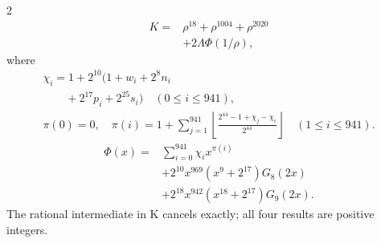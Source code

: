 \documentclass[10pt]{article}
\newcommand{\fl}[1]{\left\lfloor#1\right\rfloor}
\begin{document}
\begin{multicols}{2}
\begin{align*}
K={}&\rho^{18}+\rho^{1004}+\rho^{2020}\\
&+2\Lambda\Phi(1/\rho),
\end{align*}
where
\[
\begin{gathered}
\chi_i=1+2^{10}(1+w_i+2^8n_i\\
\qquad+2^{17}p_i+2^{25}s_i)\quad(0\le i\le941),\\
\pi(0)=0,\quad\pi(i)=1+\sum_{j=1}^{941}
\fl{\frac{2^{44}-1+\chi_j-\chi_i}{2^{44}}}\quad(1\le i\le941).
\end{gathered}
\]
\[
\begin{split}
\Phi(x)={}&\sum_{i=0}^{941}\chi_i x^{\pi(i)}\\
&+2^{10}x^{969}(x^9+2^{17})G_8(2x)\\
&+2^{18}x^{942}(x^{18}+2^{17})G_9(2x).
\end{split}
\]
The rational intermediate in K cancels exactly; all four results are positive integers.


\end{multicols}
\end{document}
